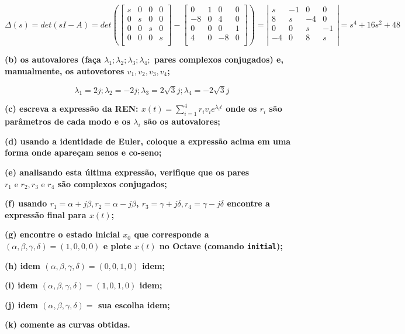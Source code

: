 \documentclass[11pt]{article}
\begin{document}
\[
\Delta(s) = det(sI - A) = det\left(
\left[ {\begin{array}{cccc}
  s & 0 & 0 & 0 \\
  0 & s & 0 & 0 \\
  0 & 0 & s & 0 \\
  0 & 0 & 0 & s \\
\end{array} } \right]
-
\left[ {\begin{array}{cccc}
  0 & 1 & 0 & 0 \\
  -8 & 0 & 4 & 0 \\
  0 & 0 & 0 & 1 \\
  4 & 0 & -8 & 0 \\
  \end{array} } \right]
  \right)
  =
  \left| \begin{array}{cccc}
    s & -1  & 0 &  0\\ 
    8 & s & -4 & 0 \\
    0 & 0  & s & -1 \\
    -4 & 0  & 8 & s \\
  \end{array}
  \right|
  = s^4 + 16s^2 + 48
\]

\textbf{(b) os autovalores (faça $\lambda_1; \lambda_2; \lambda_3; \lambda_4;$ pares complexos conjugados) e, manualmente, os autovetores $v_1, v_2, v_3, v_4$;}

\[
  \lambda_1 = 2j; \lambda_2 = -2j; \lambda_3 = 2\sqrt{3}j; \lambda_4 = -2\sqrt{3}j
\]

\textbf{(c) escreva a expressão da REN: $x(t) = \sum_{i=1}^{4} r_i v_i e^{\lambda_i t}$ onde os $r_i$ são parâmetros de cada modo e os $\lambda_i$ são os autovalores;}

\textbf{(d) usando a identidade de Euler, coloque a expressão acima em uma forma onde apareçam senos e co-seno;}

\textbf{(e) analisando esta última expressão, verifique que os pares $r_1 \text{ e } r_2, r_3 \text{ e } r_4$ são complexos conjugados;}

\textbf{(f) usando $r_1 = \alpha + j\beta, r_2 = \alpha - j\beta$, $r_3 = \gamma + j\delta, r_4 = \gamma - j\delta$ encontre a expressão final para $x(t)$;}

\textbf{(g) encontre o estado inicial $x_0$ que corresponde a $(\alpha, \beta, \gamma, \delta) = (1, 0, 0, 0)$ e plote $x(t)$ no Octave (comando \texttt{initial});}

\textbf{(h) idem $(\alpha, \beta, \gamma, \delta) = (0, 0, 1, 0)$ idem;}

\textbf{(i) idem $(\alpha, \beta, \gamma, \delta) = (1, 0, 1, 0)$ idem;}

\textbf{(j) idem $(\alpha, \beta, \gamma, \delta) = $ sua escolha idem;}

\textbf{(k) comente as curvas obtidas.}
\end{document}

